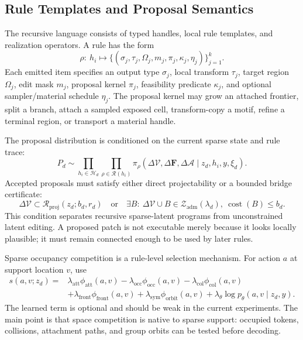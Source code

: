 \subsection{Rule Templates and Proposal Semantics}

The recursive language consists of typed handles, local rule templates, and
realization operators. A rule has the form
\begin{equation}
  \rho:\ h_i \mapsto
  \{(\sigma_j,\tau_j,\Omega_j,m_j,\pi_j,\kappa_j,\eta_j)\}_{j=1}^{k}.
  \label{eq:reviewer-rule-template}
\end{equation}
Each emitted item specifies an output type $\sigma_j$, local transform
$\tau_j$, target region $\Omega_j$, edit mask $m_j$, proposal kernel $\pi_j$,
feasibility predicate $\kappa_j$, and optional sampler/material schedule
$\eta_j$. The proposal kernel may grow an attached frontier, split a branch,
attach a sampled exposed cell, transform-copy a motif, refine a terminal
region, or transport a material handle.

The proposal distribution is conditioned on the current sparse state and rule
trace:
\begin{equation}
  P_d\sim
  \prod_{h_i\in\mathcal H_d}
  \prod_{\rho\in\mathcal R(h_i)}
  \pi_\rho(\Delta\mathcal V,\Delta\mathbf F,\Delta\mathcal A
  \mid z_d,h_i,y,\xi_d).
\end{equation}
Accepted proposals must satisfy either direct projectability or a bounded
bridge certificate:
\begin{equation}
  \Delta\mathcal V\subset\mathcal R_{\mathrm{proj}}(z_d;b_d,r_d)
  \quad\mathrm{or}\quad
  \exists B:\ 
  \Delta\mathcal V\cup B\in\mathcal Z_{\mathrm{adm}}(\lambda_d),
  \ \operatorname{cost}(B)\le b_d.
  \label{eq:reviewer-bridge-certificate}
\end{equation}
This condition separates recursive sparse-latent programs from unconstrained
latent editing. A proposed patch is not executable merely because it looks
locally plausible; it must remain connected enough to be used by later rules.

Sparse occupancy competition is a rule-level selection mechanism. For action
$a$ at support location $v$, use
\begin{equation}
\begin{split}
  s(a,v;z_d)=&
  \lambda_{\mathrm{att}}\phi_{\mathrm{att}}(a,v)
  -\lambda_{\mathrm{occ}}\phi_{\mathrm{occ}}(a,v)
  -\lambda_{\mathrm{col}}\phi_{\mathrm{col}}(a,v)\\
  &+\lambda_{\mathrm{front}}\phi_{\mathrm{front}}(a,v)
  +\lambda_{\mathrm{sym}}\phi_{\mathrm{orbit}}(a,v)
  +\lambda_{\theta}\log p_\theta(a,v\mid z_d,y).
\end{split}
\label{eq:reviewer-competition-score}
\end{equation}
The learned term is optional and should be weak in the current experiments. The
main point is that space competition is native to sparse support: occupied
tokens, collisions, attachment paths, and group orbits can be tested before
decoding.

